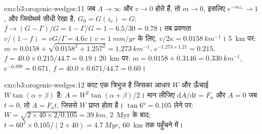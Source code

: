 \begin{solution}{exo:b3:orogenic-wedges:11}
जब $\Lambda \to \infty$ और $v \to 0$ होते हैं, तो $m \to 0$, इसलिए $e^{-mz_c} \to 1$, और
जियोथर्म सीधी रेखा है, $G_0 = G(z_c) = G$: $f \to (G - \Gamma)/G = 1 -
\Gamma/G = 1 - 6.5/30 = 0.78$। तब प्रवणता $v/(1 - f) = vG/\Gamma =
4.6v$। $v = \qty{1}{mm/yr}$ के लिए, $v/2\kappa = \qty{0.0158}{km^{-1}}$।
\qty{5}{km} पर: $m = 0.0158 + \sqrt{0.0158^2 + 1.257^2} = \qty{1.273}{km^{-1}}$,
$e^{-1.273\times1.21} = 0.215$, $f = 40.0\times0.215/44.7 = 0.19$।
\qty{20}{km} पर: $m = 0.0158 + 0.3146 = \qty{0.330}{km^{-1}}$, $e^{-0.399} =
0.671$, $f = 40.0\times0.671/44.7 = 0.60$।
\end{solution}

\begin{solution}{exo:b3:orogenic-wedges:12}
काट एक त्रिभुज है जिसका आधार $W$ और ऊँचाई $W\tan(\alpha + \beta)$ है:
$A = W^2\tan(\alpha + \beta)/2$। मान लीजिए $\mathrm dA/\mathrm dt = F_a$ और $A =
0$ जब $t = 0$, तो $A = F_at$, जिससे $W$ प्राप्त होता है। $\tan\ang{6} = 0.105$ लेने पर:
$W = \sqrt{2\times40\times2/0.105} = \qty{39}{km}$, \qty{2}{Myr} के बाद; $t =
60^2\times0.105/(2\times40) = \qty{4.7}{Myr}$, \qty{60}{km} तक पहुँचने में।
\end{solution}

